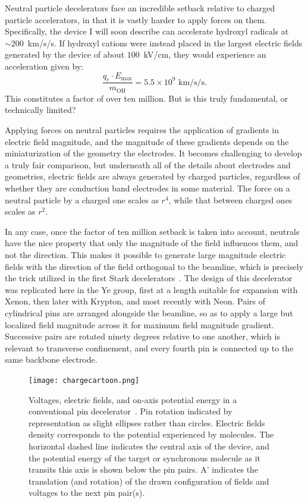Neutral particle decelerators face an incredible setback relative to charged particle accelerators, in that it is vastly harder to apply forces on them.
Specifically, the device I will soon describe can accelerate hydroxyl radicals at $\sim 200$~km/s/s. 
If hydroxyl cations were instead placed in the largest electric fields generated by the device of about $100$~kV/cm, they would experience an acceleration given by:
\begin{equation}
\frac{q_e\cdot E_\text{max} }{m_\text{OH}} = 5.5\times 10^9\text{ km/s/s}.
\end{equation}
This constitutes a factor of over ten million. 
But is this truly fundamental, or technically limited? 

Applying forces on neutral particles requires the application of gradients in electric field magnitude, and the magnitude of these gradients depends on the miniaturization of the geometry the electrodes.
It becomes challenging to develop a truly fair comparison, but underneath all of the details about electrodes and geometries, electric fields are always generated by charged particles, regardless of whether they are conduction band electrodes in some material.
The force on a neutral particle by a charged one scales as $r^4$, while that between charged ones scales as $r^2$.

In any case, once the factor of ten million setback is taken into account, neutrals have the nice property that only the magnitude of the field influences them, and not the direction. 
This makes it possible to generate large magnitude electric fields with the direction of the field orthogonal to the beamline, which is precisely the trick utilized in the first Stark decelerators~\cite{Bethlem1999}.
The design of this decelerator was replicated here in the Ye group, first at a length suitable for expansion with Xenon, then later with Krypton, and most recently with Neon.
Pairs of cylindrical pins are arranged alongside the beamline, so as to apply a large but localized field magnitude across it for maximum field magnitude gradient.
Successive pairs are rotated ninety degrees relative to one another, which is relevant to transverse confinement, and every fourth pin is connected up to the same backbone electrode.

\begin{figure}[t!]
\centering
\texttt{[image: chargecartoon.png]}%
\caption[Voltages, E-fields, and on-axis Energy]{\label{fig:decelcartoon}
Voltages, electric fields, and on-axis potential energy in a conventional pin decelerator~\cite{Bethlem1999}. Pin rotation indicated by representation as slight ellipses rather than circles. Electric fields density corresponds to the potential experienced by molecules. The horizontal dashed line indicates the central axis of the device, and the potential energy of the target or synchronous molecule as it transits this axis is shown below the pin pairs. A' indicates the translation (and rotation) of the drawn configuration of fields and voltages to the next pin pair(s). 
}
\end{figure}

